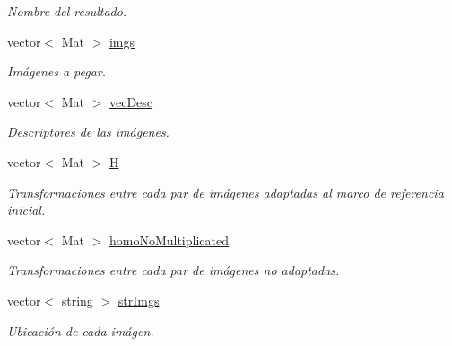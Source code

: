 \begin{DoxyCompactItemize}
\begin{DoxyCompactList}\small\item\em Nombre del resultado. \end{DoxyCompactList}\item 
\mbox{\label{classuav_1_1Stitcher_af0c6f4217fb85386b4af03330997d960}} 
vector$<$ Mat $>$ \mbox{\hyperlink{classuav_1_1Stitcher_af0c6f4217fb85386b4af03330997d960}{imgs}}
\begin{DoxyCompactList}\small\item\em Imágenes a pegar. \end{DoxyCompactList}\item 
\mbox{\label{classuav_1_1Stitcher_a742222e7b42e4ccfcda30eea161d1f02}} 
vector$<$ Mat $>$ \mbox{\hyperlink{classuav_1_1Stitcher_a742222e7b42e4ccfcda30eea161d1f02}{vec\+Desc}}
\begin{DoxyCompactList}\small\item\em Descriptores de las imágenes. \end{DoxyCompactList}\item 
\mbox{\label{classuav_1_1Stitcher_a1fad5b1dfd31fa5a9ec63b41b6e6eda1}} 
vector$<$ Mat $>$ \mbox{\hyperlink{classuav_1_1Stitcher_a1fad5b1dfd31fa5a9ec63b41b6e6eda1}{H}}
\begin{DoxyCompactList}\small\item\em Transformaciones entre cada par de imágenes adaptadas al marco de referencia inicial. \end{DoxyCompactList}\item 
\mbox{\label{classuav_1_1Stitcher_a1ff9477028582e3b935101bafb64cde7}} 
vector$<$ Mat $>$ \mbox{\hyperlink{classuav_1_1Stitcher_a1ff9477028582e3b935101bafb64cde7}{homo\+No\+Multiplicated}}
\begin{DoxyCompactList}\small\item\em Transformaciones entre cada par de imágenes no adaptadas. \end{DoxyCompactList}\item 
\mbox{\label{classuav_1_1Stitcher_a1217b2cb8a67e8928b0073b6478aa594}} 
vector$<$ string $>$ \mbox{\hyperlink{classuav_1_1Stitcher_a1217b2cb8a67e8928b0073b6478aa594}{str\+Imgs}}
\begin{DoxyCompactList}\small\item\em Ubicación de cada imágen. \end{DoxyCompactList}\item 

\end{DoxyCompactItemize}
